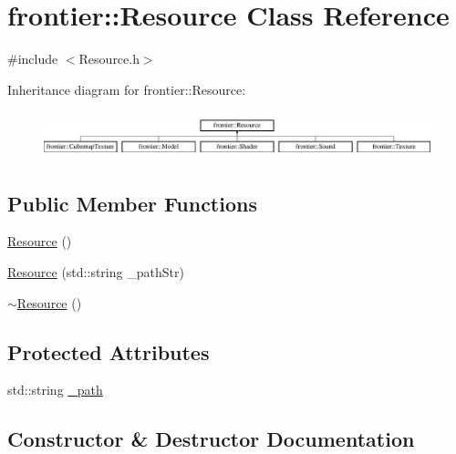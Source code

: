 \hypertarget{classfrontier_1_1_resource}{}\section{frontier\+:\+:Resource Class Reference}
\label{classfrontier_1_1_resource}


{\ttfamily \#include $<$Resource.\+h$>$}

Inheritance diagram for frontier\+:\+:Resource\+:\begin{figure}[H]
\begin{center}
\leavevmode
\includegraphics[height=1.382716cm]{classfrontier_1_1_resource}
\end{center}
\end{figure}
\subsection*{Public Member Functions}
\begin{DoxyCompactItemize}
\item 
\hyperlink{classfrontier_1_1_resource_a4ff9f98abc38d11f70b688a9886988c2}{Resource} ()
\item 
\hyperlink{classfrontier_1_1_resource_aea4c158b678419246b21b69ef27ffca6}{Resource} (std\+::string \+\_\+path\+Str)
\item 
\hyperlink{classfrontier_1_1_resource_a3bad96aa980d5300ddce81602a8d2f91}{$\sim$\+Resource} ()
\end{DoxyCompactItemize}
\subsection*{Protected Attributes}
\begin{DoxyCompactItemize}
\item 
std\+::string \hyperlink{classfrontier_1_1_resource_a69fe22a83fc57a08efd043e2c37edf7a}{\+\_\+path}
\end{DoxyCompactItemize}


\subsection{Constructor \& Destructor Documentation}
\mbox{\label{classfrontier_1_1_resource_a4ff9f98abc38d11f70b688a9886988c2}} 
